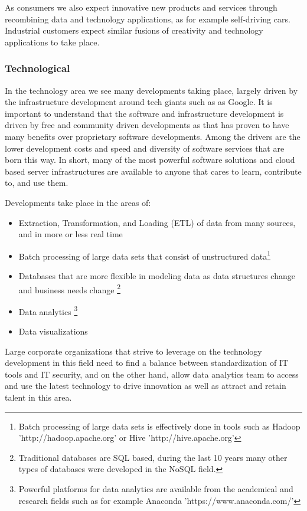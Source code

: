 \documentclass[10pt]{article} %
\begin{document}
As consumers we also expect innovative new products and services through recombining data and technology applications, as for example self-driving cars. Industrial customers expect similar fusions of creativity and technology applications to take place.

\subsubsection{Technological}
In the technology area we see many developments taking place, largely driven by the infrastructure development around tech giants such as as Google. It is important to understand that the software and infrastructure development is driven by free and community driven developments as that has proven to have many benefits over proprietary software developments. Among the drivers are the lower development costs and speed and diversity of software services that are born this way. In short, many of the most powerful software solutions and cloud based server infrastructures are available to anyone that cares to learn, contribute to, and use them.

Developments take place in the areas of:
\begin{itemize}
				\item Extraction, Transformation, and Loading (ETL) of data from many sources, and in more or less real time
				\item Batch processing of large data sets that consist of unstructured data\footnote{Batch processing of large data sets is effectively done in tools such as Hadoop 'http://hadoop.apache.org' or Hive 'http://hive.apache.org'}
				\item Databases that are more flexible in modeling data as data structures change and business needs change \footnote{Traditional databases are SQL based, during the last 10 years many other types of databases were developed in the NoSQL field.}
				\item Data analytics \footnote{Powerful platforms for data analytics are available from the academical and research fields such as for example Anaconda 'https://www.anaconda.com/'}
				\item Data visualizations
\end{itemize}

Large corporate organizations that strive to leverage on the technology development in this field need to find a balance between standardization of IT tools and IT security, and on the other hand, allow data analytics team to access and use the latest technology to drive innovation as well as attract and retain talent in this area.
\end{document}
